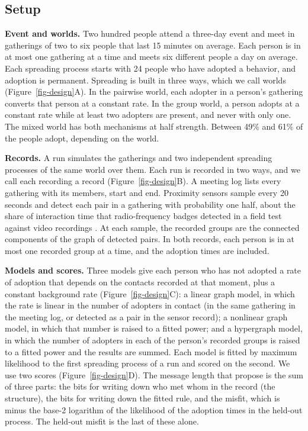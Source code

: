 \documentclass[utf8]{FrontiersinHarvard}
\begin{document}
\subsection{Setup}\label{sec-setup}

\textbf{Event and worlds.} Two hundred people attend a three-day event and meet in gatherings of two to six people that last 15 minutes on average. Each person is in at most one gathering at a time and meets six different people a day on average. Each spreading process starts with 24 people who have adopted a behavior, and adoption is permanent. Spreading is built in three ways, which we call worlds (Figure~\ref{fig-design}A). In the pairwise world, each adopter in a person's gathering converts that person at a constant rate. In the group world, a person adopts at a constant rate while at least two adopters are present, and never with only one. The mixed world has both mechanisms at half strength. Between 49\% and 61\% of the people adopt, depending on the world.

\textbf{Records.} A run simulates the gatherings and two independent spreading processes of the same world over them. Each run is recorded in two ways, and we call each recording a record (Figure~\ref{fig-design}B). A meeting log lists every gathering with its members, start and end. Proximity sensors sample every 20 seconds and detect each pair in a gathering with probability one half, about the share of interaction time that radio-frequency badges detected in a field test against video recordings \citep{elmer2019}. At each sample, the recorded groups are the connected components of the graph of detected pairs. In both records, each person is in at most one recorded group at a time, and the adoption times are included.

\textbf{Models and scores.} Three models give each person who has not adopted a rate of adoption that depends on the contacts recorded at that moment, plus a constant background rate (Figure~\ref{fig-design}C): a linear graph model, in which the rate is linear in the number of adopters in contact (in the same gathering in the meeting log, or detected as a pair in the sensor record); a nonlinear graph model, in which that number is raised to a fitted power; and a hypergraph model, in which the number of adopters in each of the person's recorded groups is raised to a fitted power and the results are summed. Each model is fitted by maximum likelihood to the first spreading process of a run and scored on the second. We use two scores (Figure~\ref{fig-design}D). The message length that \citet{rommens2026} propose is the sum of three parts: the bits for writing down who met whom in the record (the structure), the bits for writing down the fitted rule, and the misfit, which is minus the base-2 logarithm of the likelihood of the adoption times in the held-out process. The held-out misfit is the last of these alone.
\end{document}
